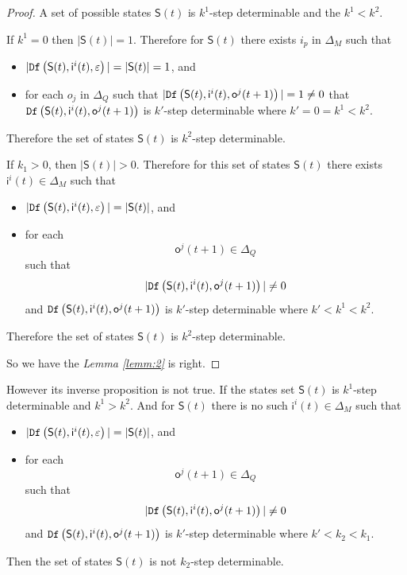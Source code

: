 \begin{proof}
 A set of possible states $\mathsf{S}(t)$ is $k^1$-step determinable and the $k^1< k^2$. 
 
 If $k^1=0$ then $|\mathsf{S}(t)|=1$. Therefore for $\mathsf{S}(t)$ there exists $i_p$ in $\Delta_M$ such that
 \begin{itemize}
 \item  $|{\tt Df}\left(\mathsf{S}(t),\mathsf{i}^{i}(t),\varepsilon\right)|=|\mathsf{S}(t)|=1$, and 
 \item  for each $o_j$ in $\Delta_Q$ such that $|{\tt Df}\left(\mathsf{S}(t),\mathsf{i}^{i}(t),\mathsf{o}^{j}(t+1)\right)|=1\neq 0$ that ${\tt Df}\left(\mathsf{S}(t),\mathsf{i}^{i}(t),\mathsf{o}^{j}(t+1)\right)$ is $k'$-step determinable where ${k'}=0=k^1< k^2$.
 \end{itemize}
 Therefore the set of states $\mathsf{S}(t)$ is $k^2$-step determinable.
 
 If $k_1>0$, then $|\mathsf{S}(t)|>0$. Therefore for this set of states $\mathsf{S}(t)$ there exists $\mathsf{i}^{i}(t) \in \Delta_M$ such that
 \begin{itemize}
 \item  $|{\tt Df}\left(\mathsf{S}(t),\mathsf{i}^{i}(t),\varepsilon\right)|=|\mathsf{S}(t)|$, and 
 \item  for each \[\mathsf{o}^{j}(t+1)\in \Delta_Q\] such that \[|{\tt Df}\left(\mathsf{S}(t),\mathsf{i}^{i}(t),\mathsf{o}^{j}(t+1)\right)|\neq 0\] and ${\tt Df}\left(\mathsf{S}(t),\mathsf{i}^{i}(t),\mathsf{o}^{j}(t+1)\right)$ is $k'$-step determinable where ${k'}<k^1< k^2$.
 \end{itemize}
 Therefore the set of states $\mathsf{S}(t)$ is $k^2$-step determinable.

 So we have the {\em Lemma \ref{lemm:2}} is right.
\end{proof}

However its inverse proposition is not true. If the states set $\mathsf{S}(t)$ is $k^1$-step determinable and $k^1> k^2$. And for $\mathsf{S}(t)$ there is no such $\mathsf{i}^{i}(t) \in\Delta_M$ such that
 \begin{itemize}
 \item  $|{\tt Df}\left(\mathsf{S}(t),\mathsf{i}^{i}(t),\varepsilon\right)|=|\mathsf{S}(t)|$, and 
 \item  for each \[\mathsf{o}^{j}(t+1)\in \Delta_Q\] such that \[|{\tt Df}\left(\mathsf{S}(t),\mathsf{i}^{i}(t),\mathsf{o}^{j}(t+1)\right)|\neq 0\] and ${\tt Df}\left(\mathsf{S}(t),\mathsf{i}^{i}(t),\mathsf{o}^{j}(t+1)\right)$ is $k'$-step determinable where ${k'}<k_2<k_1$.
 \end{itemize}
 Then the set of states $\mathsf{S}(t)$ is not $k_2$-step determinable.

